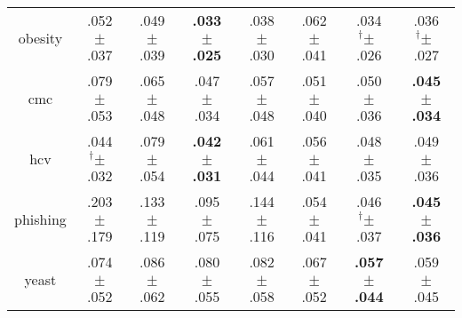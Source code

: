 \begin{tabular}{|c|ccccccc|}
obesity & .052$^{\phantom{\dag}}\pm^{\phantom{\dag}}$.037\cellcolor{red!12} & .049$^{\phantom{\dag}}\pm^{\phantom{\dag}}$.039\cellcolor{red!3} & \textbf{.033$^{\phantom{\dag}}\pm^{\phantom{\dag}}$.025}\cellcolor{green!40} & .038$^{\phantom{\dag}}\pm^{\phantom{\dag}}$.030\cellcolor{green!26} & .062$^{\phantom{\dag}}\pm^{\phantom{\dag}}$.041\cellcolor{red!40} & .034$^{\dag}\pm^{\phantom{\dag}}$.026\cellcolor{green!38} & .036$^{\dag}\pm^{\phantom{\dag}}$.027\cellcolor{green!32} \\
cmc & .079$^{\phantom{\dag}}\pm^{\phantom{\dag}}$.053\cellcolor{red!40} & .065$^{\phantom{\dag}}\pm^{\phantom{\dag}}$.048\cellcolor{red!7} & .047$^{\phantom{\dag}}\pm^{\phantom{\dag}}$.034\cellcolor{green!33} & .057$^{\phantom{\dag}}\pm^{\phantom{\dag}}$.048\cellcolor{green!10} & .051$^{\phantom{\dag}}\pm^{\phantom{\dag}}$.040\cellcolor{green!26} & .050$^{\phantom{\dag}}\pm^{\phantom{\dag}}$.036\cellcolor{green!28} & \textbf{.045$^{\phantom{\dag}}\pm^{\phantom{\dag}}$.034}\cellcolor{green!40} \\
hcv & .044$^{\dag}\pm^{\phantom{\dag}}$.032\cellcolor{green!36} & .079$^{\phantom{\dag}}\pm^{\phantom{\dag}}$.054\cellcolor{red!40} & \textbf{.042$^{\phantom{\dag}}\pm^{\phantom{\dag}}$.031}\cellcolor{green!40} & .061$^{\phantom{\dag}}\pm^{\phantom{\dag}}$.044\cellcolor{red!2} & .056$^{\phantom{\dag}}\pm^{\phantom{\dag}}$.041\cellcolor{green!9} & .048$^{\phantom{\dag}}\pm^{\phantom{\dag}}$.035\cellcolor{green!26} & .049$^{\phantom{\dag}}\pm^{\phantom{\dag}}$.036\cellcolor{green!23} \\
phishing & .203$^{\phantom{\dag}}\pm^{\phantom{\dag}}$.179\cellcolor{red!40} & .133$^{\phantom{\dag}}\pm^{\phantom{\dag}}$.119\cellcolor{red!4} & .095$^{\phantom{\dag}}\pm^{\phantom{\dag}}$.075\cellcolor{green!14} & .144$^{\phantom{\dag}}\pm^{\phantom{\dag}}$.116\cellcolor{red!10} & .054$^{\phantom{\dag}}\pm^{\phantom{\dag}}$.041\cellcolor{green!35} & .046$^{\dag}\pm^{\phantom{\dag}}$.037\cellcolor{green!39} & \textbf{.045$^{\phantom{\dag}}\pm^{\phantom{\dag}}$.036}\cellcolor{green!40} \\
yeast & .074$^{\phantom{\dag}}\pm^{\phantom{\dag}}$.052\cellcolor{red!5} & .086$^{\phantom{\dag}}\pm^{\phantom{\dag}}$.062\cellcolor{red!40} & .080$^{\phantom{\dag}}\pm^{\phantom{\dag}}$.055\cellcolor{red!22} & .082$^{\phantom{\dag}}\pm^{\phantom{\dag}}$.058\cellcolor{red!29} & .067$^{\phantom{\dag}}\pm^{\phantom{\dag}}$.052\cellcolor{green!11} & \textbf{.057$^{\phantom{\dag}}\pm^{\phantom{\dag}}$.044}\cellcolor{green!40} & .059$^{\phantom{\dag}}\pm^{\phantom{\dag}}$.045\cellcolor{green!36} \\

\end{tabular}
